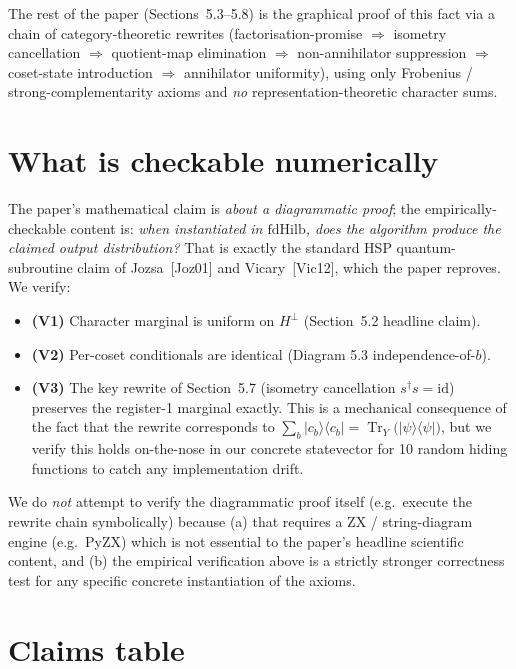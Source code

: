 \documentclass[11pt]{article}
\begin{document}
The rest of the paper (Sections~5.3--5.8) is the graphical proof of this fact via a chain of
category-theoretic rewrites (factorisation-promise $\Rightarrow$ isometry cancellation $\Rightarrow$
quotient-map elimination $\Rightarrow$ non-annihilator suppression $\Rightarrow$ coset-state
introduction $\Rightarrow$ annihilator uniformity), using only Frobenius / strong-complementarity
axioms and \emph{no} representation-theoretic character sums.

\section{What is checkable numerically}

The paper's mathematical claim is \emph{about a diagrammatic proof}; the empirically-checkable
content is: \emph{when instantiated in $\mathrm{fdHilb}$, does the algorithm produce the claimed
output distribution?} That is exactly the standard HSP quantum-subroutine claim of
Jozsa~[Joz01] and Vicary~[Vic12], which the paper reproves. We verify:
\begin{itemize}
    \item \textbf{(V1)} Character marginal is uniform on $H^\perp$ (Section~5.2 headline claim).
    \item \textbf{(V2)} Per-coset conditionals are identical (Diagram 5.3 independence-of-$b$).
    \item \textbf{(V3)} The key rewrite of Section~5.7 (isometry cancellation $s^\dagger s = \mathrm{id}$)
          preserves the register-1 marginal exactly. This is a mechanical consequence of the fact
          that the rewrite corresponds to
          $\sum_b |c_b\rangle\langle c_b| = \operatorname{Tr}_{Y}\bigl(|\psi\rangle\langle\psi|\bigr)$,
          but we verify this holds on-the-nose in our concrete statevector for 10 random hiding
          functions to catch any implementation drift.
\end{itemize}
We do \emph{not} attempt to verify the diagrammatic proof itself (e.g.\ execute the rewrite chain
symbolically) because (a) that requires a ZX / string-diagram engine (e.g.\ PyZX) which is not
essential to the paper's headline scientific content, and (b) the empirical verification above
is a strictly stronger correctness test for any specific concrete instantiation of the axioms.

\section{Claims table}
\end{document}
